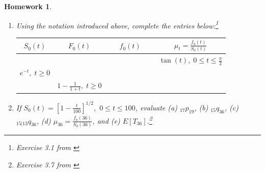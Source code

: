 \documentclass[11pt,fleqn,oneside]{book}
\newtheorem{homework}{Homework}
\begin{document}
\begin{homework}
\label{HW2}
\begin{enumerate}
\item Using the notation introduced above, complete the entries below:\footnote{Exercise 3.1 from \cite{BOWERS}}\\
\begin{tabular}{c | c | c | c}
$S_0(t)$ & $F_0(t)$ & $f_0(t)$ & $\mu_t = \frac{f_0(t)}{S_0(t)}$ \\
\hline
&&& $\tan(t),\;0 \leq t \leq \frac{\pi}{2}$ \\
$e^{-t},\;t\geq 0$  & &$\quad\quad\quad\quad\quad\quad$ & \\
&$1 - \frac{1}{1+t},\;t\geq 0$   & & 
\end{tabular}
\item If $S_0(t) = \left[1 - \frac{t}{100}\right]^{1/2},$ $0\leq t \leq 100$, evaluate (a) $_{17}p_{19}$, (b) $_{15}q_{36}$, (c) $_{15|13}q_{36}$, (d) $\mu_{36} = \frac{f_0(36)}{S_0(36)}$,  and (e) $E[T_{36}]$.\footnote{Exercise 3.7 from \cite{BOWERS}}
\end{enumerate}
\end{homework}
\end{document}
